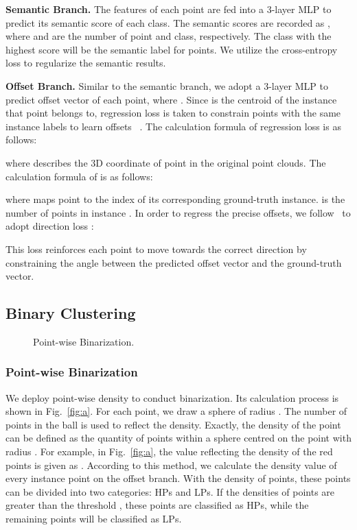 \documentclass[10pt,twocolumn,letterpaper]{article}
\begin{document}
\noindent\textbf{Semantic Branch.}
The features of each point are fed into a 3-layer MLP to predict its semantic score of each class. The semantic scores are recorded as , where  and  are the number of point and class, respectively. The class with the highest score will be the semantic label for points. We utilize the cross-entropy loss  to regularize the semantic results.

\noindent\textbf{Offset Branch.} Similar to the semantic branch, we adopt a 3-layer MLP to predict offset vector  of each point, where . Since  is the centroid of the instance that point  belongs to,  regression loss is taken to constrain points with the same instance labels to learn offsets ~\cite{qi2019deep,jiang2020pointgroup}. The calculation formula of  regression loss is as follows:

where  describes the 3D coordinate of point  in the original point clouds. The calculation formula of  is as follows: 


where  maps point  to the index of its corresponding ground-truth instance.  is the number of points in instance . In order to regress the precise offsets, we follow~\cite{lahoud20193d,jiang2020pointgroup} to adopt direction loss :

This loss reinforces each point to move towards the correct direction by constraining the angle between the predicted offset vector and the ground-truth vector.

\subsection{Binary Clustering}

\begin{figure}[ht]
  \centering
  \hfill
  \caption{Point-wise Binarization.}
  \label{fig:pb}
\end{figure}

\subsubsection{Point-wise Binarization}
We deploy point-wise density to conduct binarization. Its calculation process is shown in Fig.~\ref{fig:a}. For each point, we draw a sphere of radius . The number of points in the ball is used to reflect  the density. Exactly, the density of  the point   can be defined as the quantity of points within a sphere centred on the point  with radius . For example, in Fig.~\ref{fig:a}, the value reflecting the density of the red points is given as . According to this method, we calculate the density value of every instance point on the offset branch. With the density of points, these points can be divided into two categories: HPs and LPs. If the densities of points are greater than the threshold , these points are classified as HPs, while the remaining points will be classified as LPs.
\end{document}
